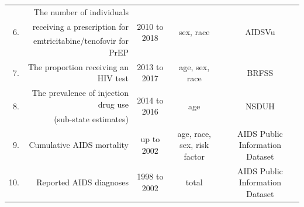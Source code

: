 \documentclass{article}
\begin{document}
\begin{table}[H]
\begin{tabular}{r r c c c}
		\multirow{3}{*}{6.} & The number of individuals & \multirow{3}{*}{2010 to 2018} & \multirow{3}{*}{sex, race} & \multirow{3}{*}{AIDSVu \cite{aidsvu_prep} }\\
		& receiving a prescription for & & & \\
		& emtricitabine/tenofovir for PrEP & & & \\
		\hline
		
		7. & The proportion receiving an HIV test & 2013 to 2017 & age, sex, race & BRFSS \cite{brfss.13.17} \\
		\hline
		
		\multirow{2}{*}{8.} & The prevalence of injection drug use & \multirow{2}{*}{2014 to 2016} & \multirow{2}{*}{age} & \multirow{2}{*}{NSDUH \cite{nsduh} }\\
		& (sub-state estimates) & & & \\
		\hline
		
		9. & Cumulative AIDS mortality & up to 2002 & age, race, sex, risk factor & AIDS Public Information Dataset\cite{apids} \\
		\hline
		
		10. & Reported AIDS diagnoses & 1998 to 2002 & total &  AIDS Public Information Dataset\cite{apids} \\
		\hline		
	\end{tabular}
\end{table}


\newpage
\end{document}

